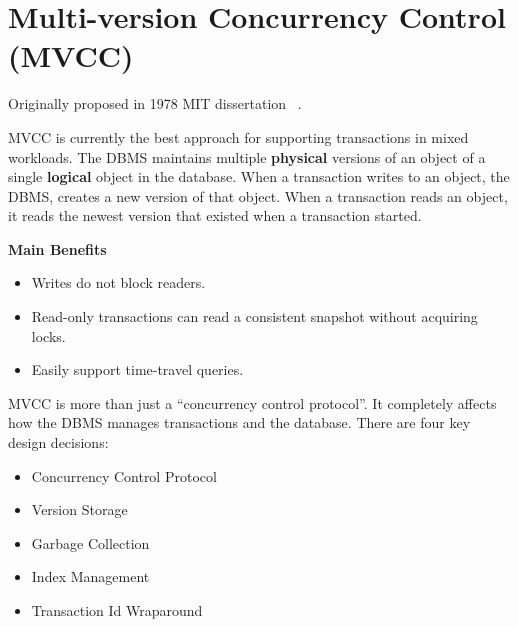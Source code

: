 \documentclass[11pt]{article}
\begin{document}
\maketitle
\thispagestyle{plain}

\section{Multi-version Concurrency Control (MVCC)}
Originally proposed in 1978 MIT dissertation ~\cite{reed1978naming}.

MVCC is currently the best approach for supporting transactions in mixed workloads.
The DBMS maintains multiple \textbf{physical} versions of an object of a single 
\textbf{logical} object in the database. 
When a transaction writes to an object, the DBMS, creates a new version of that object.
When a transaction reads an object, it reads the newest version that existed when a 
transaction started.
    
\textbf{Main Benefits}
\begin{itemize}
    \item Writes do not block readers.
    \item Read-only transactions can read a consistent snapshot without acquiring locks.
    \item Easily support time-travel queries.
\end{itemize}

MVCC is more than just a ``concurrency control protocol''. It completely affects how the 
DBMS manages transactions and the database. There are four key design decisions:~\cite{p781-wu}
\begin{itemize}
    \item Concurrency Control Protocol
    \item Version Storage
    \item Garbage Collection
    \item Index Management
    \item Transaction Id Wraparound
\end{itemize}
\end{document}
